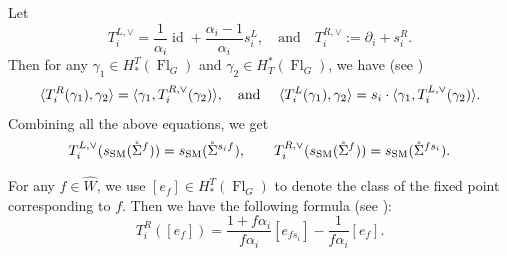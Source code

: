 \documentclass[12pt]{amsart}
\def\SSM{s_{\rm SM}}
\def\T{T}
\def\id{\operatorname{id}}
\def\Fl{\operatorname{Fl}}
\begin{document}
Let \[\T_i^{L,\vee} = \frac{1}{\alpha_i}\id+\frac{\alpha_i-1}{\alpha_i}s_i^L,\quad \text{and}\quad T_i^{R,\vee}:=\partial_i+s_i^R.\] Then for any $\gamma_1\in H_*^T(\Fl_G)$ and $\gamma_2\in H_T^*(\Fl_G)$, we have (see \cite{AMSS23, MNS})
\[\langle T_i^{R}(\gamma_1), \gamma_2\rangle = \langle\gamma_1, T_i^{R,\vee}(\gamma_2)\rangle, \text{\quad and \quad} \langle T_i^{L}(\gamma_1), \gamma_2\rangle = s_i\cdot \langle\gamma_1, T_i^{L,\vee}(\gamma_2)\rangle.\]
Combining all the above equations, we get
\begin{equation*}\label{equ:LRcsm}
    T_i^{L,\vee} (\SSM(\mathring{\Sigma}^{f}))=\SSM(\mathring{\Sigma}^{s_if}),\qquad
T_i^{R,\vee} (\SSM(\mathring{\Sigma}^{f}))=\SSM(\mathring{\Sigma}^{fs_i}).
\end{equation*}


For any $f\in \widehat{W}$, we use $[e_f]\in H_*^T(\Fl_G)$ to denote the class of the fixed point corresponding to $f$. Then we have the following formula (see \cite{MNS}):
\begin{equation*}\label{equ:actonfixed}
    T_i^{R}([e_f])=\frac{1+f\alpha_i}{f\alpha_i}[e_{fs_i}]-\frac{1}{f\alpha_i}[e_f].
\end{equation*}
\end{document}
